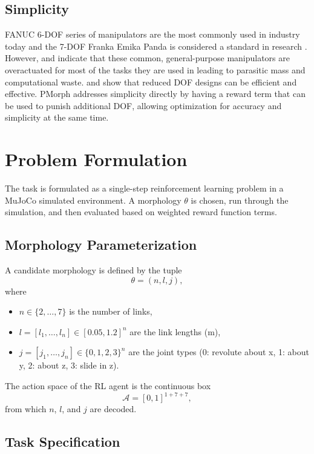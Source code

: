 \documentclass[defaultstyle,11pt]{thesis}
\begin{document}
\section{Simplicity}
FANUC 6-DOF series of manipulators are the most commonly used in industry today \cite{patentpc2025toprobotics}\cite{standardbots2025fanucprice} and the 7-DOF Franka Emika Panda is considered a standard in research \cite{haddadin2022franka}\cite{oliva2022franksim}.
However, \cite{russo2021task} and \cite{he2019underactuated} indicate that these common, general-purpose manipulators are overactuated for most of the tasks they are used in leading to parasitic mass and computational waste.
\cite{fasquell2020bioinspired} and \cite{nakano2023robostrich} show that reduced DOF designs can be efficient and effective.
PMorph addresses simplicity directly by having a reward term that can be used to punish additional DOF, allowing optimization for accuracy and simplicity at the same time.

\chapter{Problem Formulation}
\label{sec:problem}

The task is formulated as a single-step reinforcement learning problem in a MuJoCo simulated environment.
A morphology $\theta$ is chosen, run through the simulation, and then evaluated based on weighted reward function terms.

\section{Morphology Parameterization}

A candidate morphology is defined by the tuple
\[
\theta = (n, l, j),
\]
where
\begin{itemize}
    \item $n \in \{2, \dots, 7\}$ is the number of links,
    \item $l = [l_1, \dots, l_n] \in [0.05, 1.2]^n$ are the link lengths (m),
    \item $j = [j_1, \dots, j_n] \in \{0,1,2,3\}^n$ are the joint types (0: revolute about x, 1: about y, 2: about z, 3: slide in z).
\end{itemize}
The action space of the RL agent is the continuous box
\[
\mathcal{A} = [0,1]^{1 + 7 + 7},
\]
from which $n$, $l$, and $j$ are decoded.

\section{Task Specification}
\end{document}
